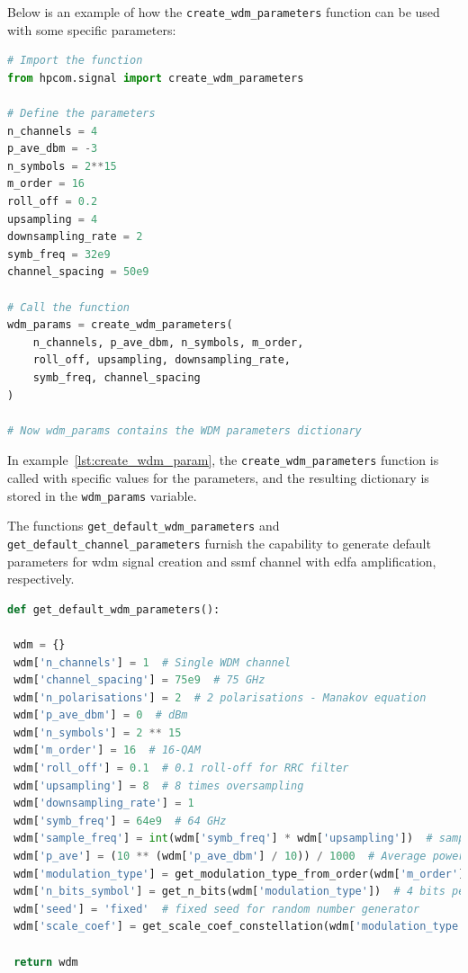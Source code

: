 Below is an example of how the \texttt{create\_wdm\_parameters} function can be used with some specific parameters:

\begin{lstlisting}[language=Python, caption=Usage of create\_wdm\_parameters function, label=lst:create_wdm_param]
# Import the function
from hpcom.signal import create_wdm_parameters

# Define the parameters
n_channels = 4
p_ave_dbm = -3
n_symbols = 2**15
m_order = 16
roll_off = 0.2
upsampling = 4
downsampling_rate = 2
symb_freq = 32e9
channel_spacing = 50e9

# Call the function
wdm_params = create_wdm_parameters(
    n_channels, p_ave_dbm, n_symbols, m_order, 
    roll_off, upsampling, downsampling_rate, 
    symb_freq, channel_spacing
)

# Now wdm_params contains the WDM parameters dictionary
\end{lstlisting}

In example~\ref{lst:create_wdm_param}, the \texttt{create\_wdm\_parameters} function is called with specific values for the parameters, and the resulting dictionary is stored in the \texttt{wdm\_params} variable.

The functions \texttt{get\_default\_wdm\_parameters} and \texttt{get\_default\_channel\_parameters} furnish the capability to generate default parameters for \Gls{wdm} signal creation and \gls{ssmf} channel with \gls{edfa} amplification, respectively.

\begin{lstlisting}[language=Python, caption=Default WDM parameters, label=lst:default_wdm_param]
def get_default_wdm_parameters():

 wdm = {}
 wdm['n_channels'] = 1  # Single WDM channel
 wdm['channel_spacing'] = 75e9  # 75 GHz
 wdm['n_polarisations'] = 2  # 2 polarisations - Manakov equation
 wdm['p_ave_dbm'] = 0  # dBm
 wdm['n_symbols'] = 2 ** 15
 wdm['m_order'] = 16  # 16-QAM
 wdm['roll_off'] = 0.1  # 0.1 roll-off for RRC filter
 wdm['upsampling'] = 8  # 8 times oversampling
 wdm['downsampling_rate'] = 1
 wdm['symb_freq'] = 64e9  # 64 GHz
 wdm['sample_freq'] = int(wdm['symb_freq'] * wdm['upsampling'])  # sampling frequency
 wdm['p_ave'] = (10 ** (wdm['p_ave_dbm'] / 10)) / 1000  # Average power in Watts
 wdm['modulation_type'] = get_modulation_type_from_order(wdm['m_order'])  # 16-QAM
 wdm['n_bits_symbol'] = get_n_bits(wdm['modulation_type'])  # 4 bits per symbol
 wdm['seed'] = 'fixed'  # fixed seed for random number generator
 wdm['scale_coef'] = get_scale_coef_constellation(wdm['modulation_type']) / np.sqrt(wdm['p_ave'] / wdm['n_polarisations'])  # scale coefficient for constellation

 return wdm
\end{lstlisting}


